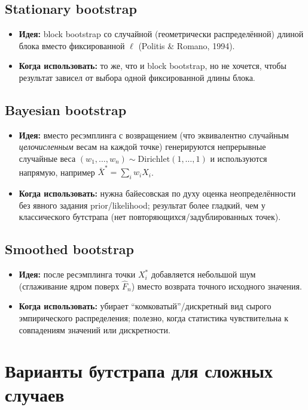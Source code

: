 \documentclass[11pt]{article}
\begin{document}
\subsection*{Stationary bootstrap}
\begin{itemize}
  \item \textbf{Идея:} block bootstrap со случайной (геометрически распределённой) длиной блока вместо фиксированной $\ell$ (Politis \& Romano, 1994).
  \item \textbf{Когда использовать:} то же, что и block bootstrap, но не хочется, чтобы результат зависел от выбора одной фиксированной длины блока.
\end{itemize}

\subsection*{Bayesian bootstrap}
\begin{itemize}
  \item \textbf{Идея:} вместо ресэмплинга с возвращением (что эквивалентно случайным \emph{целочисленным} весам на каждой точке) генерируются непрерывные случайные веса $(w_1,\dots,w_n) \sim \mathrm{Dirichlet}(1,\dots,1)$ и используются напрямую, например $\bar X^* = \sum_i w_i X_i$.
  \item \textbf{Когда использовать:} нужна байесовская по духу оценка неопределённости без явного задания prior/likelihood; результат более гладкий, чем у классического бутстрапа (нет повторяющихся/задублированных точек).
\end{itemize}

\subsection*{Smoothed bootstrap}
\begin{itemize}
  \item \textbf{Идея:} после ресэмплинга точки $X_i^*$ добавляется небольшой шум (сглаживание ядром поверх $\widehat F_n$) вместо возврата точного исходного значения.
  \item \textbf{Когда использовать:} убирает ``комковатый''/дискретный вид сырого эмпирического распределения; полезно, когда статистика чувствительна к совпадениям значений или дискретности.
\end{itemize}

\section{Варианты бутстрапа для сложных случаев}
\end{document}
